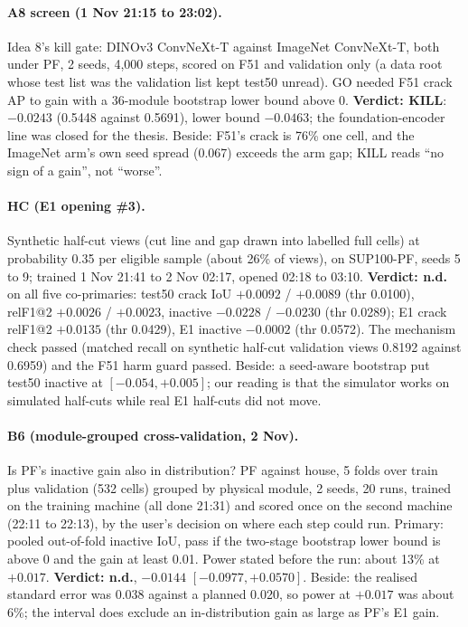 \paragraph{A8 screen (1 Nov 21:15 to 23:02).} Idea 8's kill gate: DINOv3 ConvNeXt-T \citep{simeoni2025dinov3} against ImageNet
ConvNeXt-T, both under PF, 2 seeds, 4,000 steps, scored on F51 and validation only (a data root whose test list was the validation
list kept test50 unread). GO needed F51 crack AP to gain with a 36-module bootstrap lower bound above 0. \textbf{Verdict: KILL}: $-0.0243$
(0.5448 against 0.5691), lower bound $-0.0463$; the foundation-encoder line was closed for the thesis. Beside: F51's crack is 76\% one
cell, and the ImageNet arm's own seed spread (0.067) exceeds the arm gap; KILL reads ``no sign of a gain'', not ``worse''.

\paragraph{HC (E1 opening \#3).} Synthetic half-cut views (cut line and gap drawn into labelled full cells) at probability 0.35 per
eligible sample (about 26\% of views), on SUP100-PF, seeds 5 to 9; trained 1 Nov 21:41 to 2 Nov 02:17, opened 02:18 to 03:10.
\textbf{Verdict: n.d.} on all five co-primaries: test50 crack IoU $+0.0092$ / $+0.0089$ (thr 0.0100), relF1@2 $+0.0026$ / $+0.0023$,
inactive $-0.0228$ / $-0.0230$ (thr 0.0289); E1 crack relF1@2 $+0.0135$ (thr 0.0429), E1 inactive $-0.0002$ (thr 0.0572). The
mechanism check passed (matched recall on synthetic half-cut validation views 0.8192 against 0.6959) and the F51 harm guard passed.
Beside: a seed-aware bootstrap put test50 inactive at $[-0.054, +0.005]$; our reading is that the simulator works on simulated
half-cuts while real E1 half-cuts did not move.

\paragraph{B6 (module-grouped cross-validation, 2 Nov).} Is PF's inactive gain also in distribution? PF against house, 5 folds over
train plus validation (532 cells) grouped by physical module, 2 seeds, 20 runs, trained on the training machine (all done 21:31) and
scored once on the second machine (22:11 to 22:13), by the user's decision on where each step could run. Primary: pooled out-of-fold inactive
IoU, pass if the two-stage bootstrap lower bound is above 0 and the gain at least 0.01. Power stated before the run: about 13\% at
$+0.017$. \textbf{Verdict: n.d.}, $-0.0144$ $[-0.0977, +0.0570]$. Beside: the realised standard error was 0.038 against a planned
0.020, so power at $+0.017$ was about 6\%; the interval does exclude an in-distribution gain as large as PF's E1 gain.

